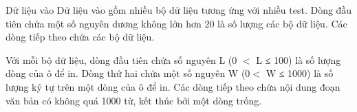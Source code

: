 Dữ liệu vào
Dữ liệu vào gồm nhiều bộ dữ liệu tương ứng với nhiều test. Dòng đầu tiên chứa một số nguyên dương không lớn hơn 20 là số lượng các bộ dữ liệu. Các dòng tiếp theo chứa các bộ dữ liệu.  

   Với mỗi bộ dữ liệu, dòng đầu tiên chứa số nguyên L (0 $<$ L ≤ 100) là số lượng dòng của ô để in. Dòng thứ hai chứa một số nguyên W (0$<$ W ≤ 1000) là số lượng ký tự trên một dòng của ô để in. Các dòng tiếp theo chứa nội dung đoạn văn bản có không quá 1000 từ, kết thúc bởi một dòng trống.